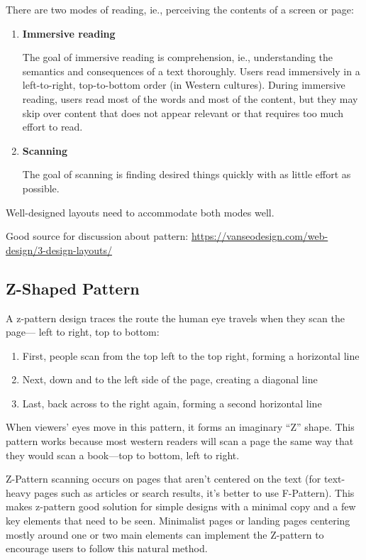 There are two modes of reading, ie., perceiving the contents of a screen or page:
\begin{enumerate}
	\item \textbf{Immersive reading} \par The goal of immersive reading is comprehension, ie., understanding the semantics and consequences of a text thoroughly.
	Users read immersively in a left-to-right, top-to-bottom order (in Western cultures).
	During immersive reading, users read most of the words and most of the content, but they may skip over content that does not appear relevant or that requires too much effort to read.
	
	\item \textbf{Scanning} \par The goal of scanning is finding desired things quickly with as little effort as possible.
\end{enumerate}
Well-designed layouts need to accommodate both modes well. 

Good source for discussion about pattern: \url{https://vanseodesign.com/web-design/3-design-layouts/}

\subsection{Z-Shaped Pattern} %
\label{sub:z_shaped_pattern}

A z-pattern design traces the route the human eye travels when they scan the page— left to right, top to bottom:
\begin{enumerate}
	\item First, people scan from the top left to the top right, forming a horizontal line
	\item Next, down and to the left side of the page, creating a diagonal line
	\item Last, back across to the right again, forming a second horizontal line
\end{enumerate}
When viewers’ eyes move in this pattern, it forms an imaginary ``Z'' shape.
This pattern works because most western readers will scan a page the same way that they would scan a book---top to bottom, left to right.

Z-Pattern scanning occurs on pages that aren’t centered on the text (for text-heavy pages such as articles or search results, it’s better to use F-Pattern). This makes z-pattern good solution for simple designs with a minimal copy and a few key elements that need to be seen. Minimalist pages or landing pages centering mostly around one or two main elements can implement the Z-pattern to encourage users to follow this natural method.

